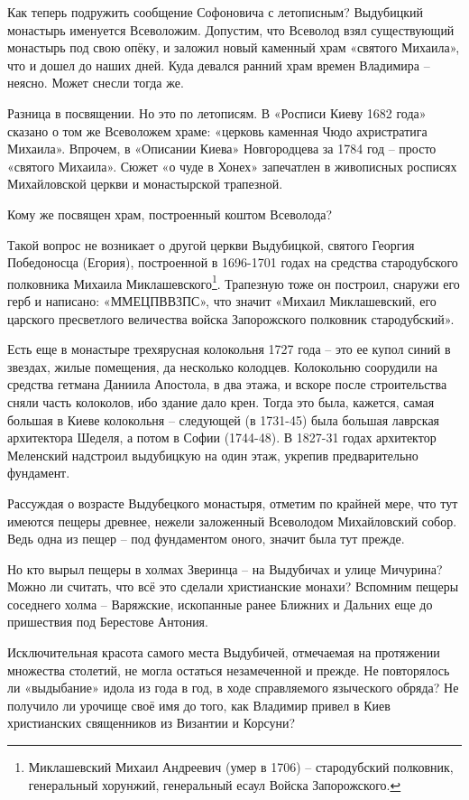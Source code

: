 Как теперь подружить сообщение Софоновича с летописным? Выдубицкий монастырь именуется Всеволожим. Допустим, что Всеволод взял существующий монастырь под свою опёку, и заложил новый каменный храм «святого Михаила», что и дошел до наших дней. Куда девался ранний храм времен Владимира – неясно. Может снесли тогда же.

Разница в посвящении. Но это по летописям. В «Росписи Киеву 1682 года» сказано о том же Всеволожем храме: «церковь каменная Чюдо ахристратига Михаила». Впрочем, в «Описании Киева» Новгородцева за 1784 год – просто «святого Михаила». Сюжет «о чуде в Хонех» запечатлен в живописных росписях Михайловской церкви и монастырской трапезной.

Кому же посвящен храм, построенный коштом Всеволода? 

Такой вопрос не возникает о другой церкви Выдубицкой, святого Георгия Победоносца (Егория), построенной в 1696-1701 годах на средства стародубского полковника Михаила Миклашевского\footnote{Миклашевский Михаил Андреевич (умер в 1706) – стародубский полковник, генеральный хорунжий, генеральный есаул Войска Запорожского.}. Трапезную тоже он построил, снаружи его герб и написано: «ММЕЦПВВЗПС», что значит «Михаил Миклашевский, его царского пресветлого величества войска Запорожского полковник стародубский». 

Есть еще в монастыре трехярусная колокольня 1727 года – это ее купол синий в звездах, жилые помещения, да несколько колодцев. Колокольню соорудили на средства гетмана Даниила Апостола, в два этажа, и вскоре после строительства сняли часть колоколов, ибо здание дало крен. Тогда это была, кажется, самая большая в Киеве колокольня – следующей (в 1731-45) была большая лаврская архитектора Шеделя, а потом в Софии (1744-48). В 1827-31 годах архитектор Меленский надстроил выдубицкую на один этаж, укрепив предварительно фундамент. 

Рассуждая о возрасте Выдубецкого монастыря, отметим по крайней мере, что тут имеются пещеры древнее, нежели заложенный Всеволодом Михайловский собор. Ведь одна из пещер – под фундаментом оного, значит была тут прежде. 

Но кто вырыл пещеры в холмах Зверинца – на Выдубичах и улице Мичурина? Можно ли считать, что всё это сделали христианские монахи? Вспомним пещеры соседнего холма – Варяжские, ископанные ранее Ближних и Дальних еще до пришествия под Берестове Антония.

Исключительная красота самого места Выдубичей, отмечаемая на протяжении множества столетий, не могла остаться незамеченной и прежде. Не повторялось ли «выдыбание» идола из года в год, в ходе справляемого языческого обряда? Не получило ли урочище своё имя до того, как Владимир привел в Киев христианских священников из Византии и Корсуни?

